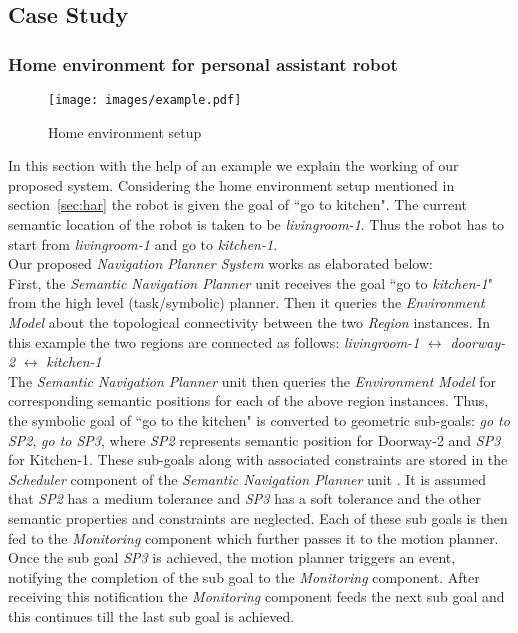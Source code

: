 \subsection{Case Study}
\subsubsection{Home environment for personal assistant robot}
\begin{figure}[htbp] %
   \centering
   \texttt{[image: images/example.pdf]}
   \caption{Home environment setup}
   \label{Test environment map}
\end{figure}
In this section with the help of an example we explain the working of our proposed system.
Considering the home environment setup mentioned in section~\ref{sec:har} the robot is given the goal of ``go to kitchen".
The current semantic location of the robot is taken to be \textit{livingroom-1}.
Thus the robot has to start from \textit{livingroom-1} and go to \textit{kitchen-1}.\\

Our proposed \textit{Navigation Planner System} works as elaborated below:\\ 
First, the \textit{Semantic Navigation Planner} unit receives the goal ``go to \textit{kitchen-1}" from the high level (task/symbolic) planner.
Then it queries the \textit{Environment Model} about the topological connectivity between the two \textit{Region} instances.
In this example the two regions are connected as follows:
\textit{livingroom-1} $\longleftrightarrow$ \textit{doorway-2} $\longleftrightarrow$ \textit{kitchen-1}\\
The \textit{Semantic Navigation Planner} unit then queries the \textit{Environment Model} for corresponding semantic positions for each of the above region instances.
Thus, the symbolic goal of ``go to the kitchen" is converted to geometric sub-goals: \textit{go to SP2}, \textit{go to SP3}, where \textit{SP2} represents semantic position for Doorway-2 and \textit{SP3} for Kitchen-1.
These sub-goals along with associated constraints are stored in the \textit{Scheduler} component of the \textit{Semantic Navigation Planner} unit .
It is assumed that \textit{SP2} has a medium tolerance and \textit{SP3} has a soft tolerance and the other semantic properties and constraints are neglected.
Each of these sub goals is then fed to the \textit{Monitoring} component which further passes it to the motion planner.
Once the sub goal \textit{SP3} is achieved, the motion planner triggers an event, notifying the completion of the sub goal to the \textit{Monitoring} component.
After receiving this notification the \textit{Monitoring} component feeds the next sub goal and this continues till the last sub goal is achieved.\\

